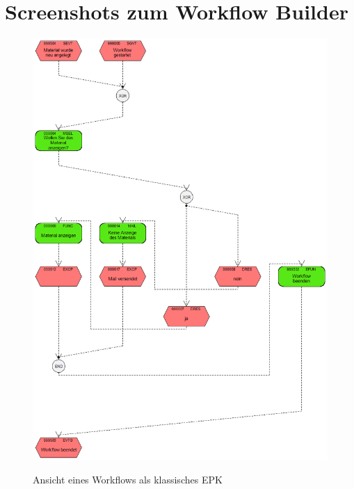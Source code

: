 \section{Screenshots zum Workflow Builder}
\begin{figure}[H]
	\begin{center}
	\includegraphics[height=0.9\textheight]{grafiken/wf-builder_view-classicepc.png}
	\caption{Ansicht eines Workflows als klassisches EPK}
	\vspace{-10pt}
	\label{abb:workflow-view-classicepc}
	\end{center}
\end{figure}

